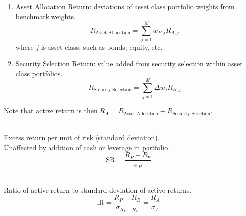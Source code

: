 \begin{remark} 
\begin{enumerate}[label=\roman*.]
\setlength{\itemsep}{0pt}
\item Asset Allocation Return: deviations of asset class portfolio weights from benchmark weights.
\begin{equation}
R_{\text{Asset Allocation}} = \sum\limits_{j=1}^M w_{P, j} R_{A, j} \nonumber
\end{equation}
where $j$ is asset class, such as bonds, equity, etc.
\item Security Selection Return: value added from security selection within asset class portfolios.
\begin{equation}
R_{\text{Security Selection}} = \sum\limits_{j=1}^M \Delta w_j R_{B,j} \nonumber
\end{equation}
\end{enumerate}
Note that active return is then $R_A = R_{\text{Asset Allocation}} + R_{\text{Security Selection}}$.
\end{remark}

\begin{definition} \\
Excess return per unit of risk (standard deviation).\\
Unaffected by addition of cash or leverage in portfolio.
\begin{equation}
\text{SR} = \frac{R_P - R_F}{\sigma_P} \nonumber
\end{equation}
\end{definition}

\begin{definition} \\
Ratio of active return to standard deviation of active returns.
\begin{equation}
\text{IR} = \frac{R_P - R_B}{\sigma_{R_P - R_B}} = \frac{R_A}{\sigma_A} \nonumber
\end{equation}
\end{definition}


